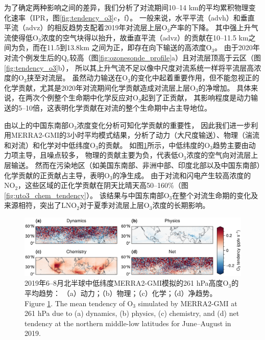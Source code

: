 为了确定两种影响之间的差异，我们分析了对流期间10--14 km的平均累积物理变化速率（IPR，图\ref{fig:tendency_o3}c，f）。
一般来说，水平平流（advh）和垂直平流（advz）的相反趋势支配着2019年对流层上层O$_3$产率的下降。
其中强上升气流使得低O$_3$浓度的空气块得以抬升，故垂直平流（advz）的贡献在10--11.5 km之间为负，而在11.5到13.8km 之间为正，即存在向下输送的高浓度O$_3$。
由于2020年对流个例发生后的Q$_v$较高（图\ref{fig:ozonesonde_profile}a）且对流层顶高于云区（图\ref{fig:tendency_o3}b），
所以其上升气流不足以像中尺度对流系统一样将平流层高浓度的O$_3$挟至对流层\citep{Phoenix.2020}。
虽然动力输送在O$_3$的变化中起着重要作用，但不能忽视正的化学贡献，尤其是2020年对流期间化学贡献造成对流层上层O$_3$的净增加。
具体来说，在两次个例整个生命期中化学反应对O$_3$起到了正贡献，
其影响程度是动力输送的5--10倍，这表明化学贡献在对流的整个生命期中占主导地位。

由以上的中国东南部O$_3$浓度变化分析可知化学贡献的重要性，
因此我们进一步利用MERRA2-GMI的3小时平均模式结果，分析了动力（大尺度输送）、物理（湍流和对流）和化学对中低纬度O$_3$的贡献。
如图\ref{fig:uto3_tendency}所示，中低纬度的O$_3$趋势主要由动力项主导，且噪点较多，
物理的贡献主要为负，代表低O$_3$浓度的空气向对流层上层输送。
然而在污染地区（如美国东南部、非洲中部、印度北部以及中国东南部）化学贡献的正贡献占主导，表明O$_3$的净生成。
由于对流和闪电产生较高浓度的NO$_2$，这些区域的正化学贡献在阴天比晴天高50--160\%（图\ref{fig:uto3_chem_tendency}）。
该结果与中国东南部O$_3$在整个对流生命期的变化及来源相符，突出了LNO$_2$对于夏季对流层上层O$_3$浓度的长期影响。


\begin{figure}[H]
    \centering
    \includegraphics[width=\textwidth]{./figures/uto3_tendency.png}
    \caption{
    2019年6--8月北半球中低纬度MERRA2-GMI模拟的261 hPa高度O$_3$的平均趋势：
    （a）动力；（b）物理；（c）化学；（d）净趋势。\\
    Figure \ref{fig:uto3_tendency}. The mean tendency of O$_3$ simulated by MERRA2-GMI at 261 hPa due to (a) dynamics, (b) physics, (c) chemistry, and (d) net tendency at the northern middle-low latitudes for June--August in 2019.
    }
    \label{fig:uto3_tendency}
\end{figure}


